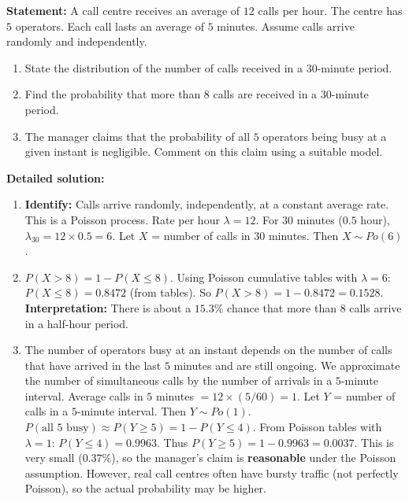 \documentclass[11pt]{article}
\begin{document}
\begin{exoresolu}
\textbf{Statement:} A call centre receives an average of $12$ calls per hour. The centre has $5$ operators. Each call lasts an average of $5$ minutes. Assume calls arrive randomly and independently.
\begin{enumerate}
    \item State the distribution of the number of calls received in a $30$-minute period.
    \item Find the probability that more than $8$ calls are received in a $30$-minute period.
    \item The manager claims that the probability of all $5$ operators being busy at a given instant is negligible. Comment on this claim using a suitable model.
\end{enumerate}

\tcblower
\textbf{Detailed solution:}
\begin{enumerate}
    \item \textbf{Identify:} Calls arrive randomly, independently, at a constant average rate. This is a Poisson process.
    Rate per hour $\lambda = 12$. For $30$ minutes ($0.5$ hour), $\lambda_{30} = 12 \times 0.5 = 6$.
    Let $X$ = number of calls in $30$ minutes. Then $X \sim Po(6)$.
    \item $P(X > 8) = 1 - P(X \le 8)$.
    Using Poisson cumulative tables with $\lambda = 6$:
    $P(X \le 8) = 0.8472$ (from tables).
    So $P(X > 8) = 1 - 0.8472 = 0.1528$.
    \textbf{Interpretation:} There is about a $15.3\%$ chance that more than $8$ calls arrive in a half-hour period.
    \item The number of operators busy at an instant depends on the number of calls that have arrived in the last $5$ minutes and are still ongoing. We approximate the number of simultaneous calls by the number of arrivals in a $5$-minute interval.
    Average calls in $5$ minutes $= 12 \times (5/60) = 1$.
    Let $Y$ = number of calls in a $5$-minute interval. Then $Y \sim Po(1)$.
    $P(\text{all 5 busy}) \approx P(Y \ge 5) = 1 - P(Y \le 4)$.
    From Poisson tables with $\lambda = 1$: $P(Y \le 4) = 0.9963$.
    Thus $P(Y \ge 5) = 1 - 0.9963 = 0.0037$.
    This is very small ($0.37\%$), so the manager's claim is \textbf{reasonable} under the Poisson assumption. However, real call centres often have bursty traffic (not perfectly Poisson), so the actual probability may be higher.
\end{enumerate}
\end{exoresolu}
\end{document}
